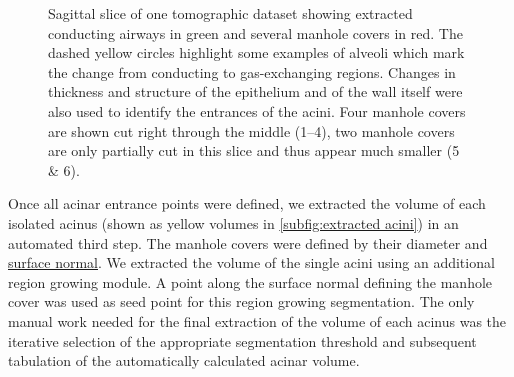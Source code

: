 \documentclass[draft,a4paper,DIVcalc,abstract,english]{scrartcl}
\newlength\imagescale		%
\begin{document}
\begin{figure}
%
	\caption{Sagittal slice of one tomographic dataset showing extracted conducting airways in green and several manhole covers in red.
		The dashed yellow circles highlight some examples of alveoli which mark the change from conducting to gas-exchanging regions.
		Changes in thickness and structure of the epithelium and of the wall itself were also used to identify the entrances of the acini.
		Four manhole covers are shown cut right through the middle (\numrange{1}{4}), two manhole covers are only partially cut in this slice and thus appear much smaller (5 \& 6).}
	\label{fig:ManholeCoverExplanation}
\end{figure}

Once all acinar entrance points were defined, we extracted the volume of each isolated acinus (shown as yellow volumes in \autoref{subfig:extracted acini}) in an automated third step.
The manhole covers were defined by their diameter and \href{https://secure.wikimedia.org/wikipedia/en/w/index.php?title=Surface_normal&oldid=411684319}{surface normal}.
We extracted the volume of the single acini using an additional region growing module.
A point along the surface normal defining the manhole cover was used as seed point for this region growing segmentation.
The only manual work needed for the final extraction of the volume of each acinus was the iterative selection of the appropriate segmentation threshold and subsequent tabulation of the automatically calculated acinar volume.
\end{document}
